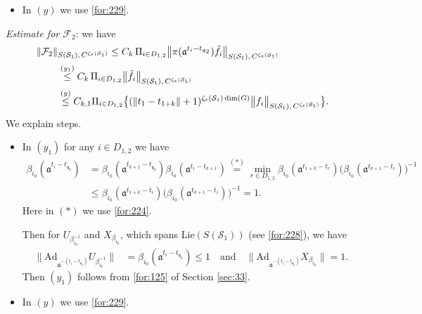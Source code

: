 \documentclass[11 pt]{amsart}
\newcommand{\norm}[1]{\lVert#1\rVert}
\theoremstyle{definition}
\numberwithin{equation}{section}
\begin{document}
\begin{itemize}
  This shows that for any $i\in D_{1,1}\cup D_2\cup \{k+1\}$ we have
 \begin{align*}
  \beta_{i_0}(\mathfrak{a}^{t_{i}-t_{ \mathfrak{q}_1}})\geq 1.
 \end{align*}
  Then for $U_{\beta_{i_0}}$, which spans $\text{Lie}(u(\mathcal{S}_1))$ (see \eqref{for:228}), we have
  \begin{align*}
 \|\text{Ad}_{\mathfrak{a}^{-(t_{i}-t_{ \mathfrak{q}_1})}}U_{\beta_{i_0}}\|=\beta_{i_0}(\mathfrak{a}^{-(t_{i}-t_{ \mathfrak{q}_1})})\leq 1.
\end{align*}
  Then $(x)$ follows from \eqref{for:125} of Section \ref{sec:33}.
  \smallskip
  \item In $(y)$ we use \eqref{for:229}.
\end{itemize}
\emph{Estimate for $\mathcal{F}_2$}: we have
\begin{align}\label{for:234}
 \norm{\mathcal{F}_2}&_{S(\mathcal{S}_1),\,C^{\zeta_\epsilon(\mathcal{S}_1)}}\leq C_k\,\Pi_{i\in D_{1,2}}\big\| \pi(\mathfrak{a}^{t_i-t_{ \mathfrak{q}_2}})\tilde{f}_i\big\|_{S(\mathcal{S}_1),\,C^{\zeta_\epsilon(\mathcal{S}_1)}}\notag\\
 &\overset{(y_1)}{\leq} C_k\,\Pi_{i\in D_{1,2}}\big\| \tilde{f}_i\big\|_{S(\mathcal{S}_1),\,C^{\zeta_\epsilon(\mathcal{S}_1)}}\notag\\
 &\overset{(y)}{\leq} C_{k,1}\Pi_{i\in D_{1,2}}\big\{(\|t_1-t_{1+k}\|+1)^{\zeta_\epsilon(\mathcal{S}_1)\dim (G)}\big\|f_i\big\|_{S(\mathcal{S}_1),\,C^{\zeta_\epsilon(\mathcal{S}_1)}}\big\}.
\end{align}
We explain steps.
\begin{itemize}



  \item In $(y_1)$ for any $i\in D_{1,2}$ we have
 \begin{align*}
   \beta_{i_0}(\mathfrak{a}^{t_{i}-t_{ \mathfrak{q}_2}})&=\beta_{i_0}(\mathfrak{a}^{t_{k+1}-t_{\mathfrak{q}_2}})\beta_{i_0}(\mathfrak{a}^{t_{ i}-t_{k+1}})\overset{(*)}{=}\min_{r\in D_{1,2}} \beta_{i_0}(\mathfrak{a}^{t_{1+k}-t_{r}})\big(\beta_{i_0}(\mathfrak{a}^{t_{k+1}-t_{ i}})\big)^{-1}\\
   &\leq \beta_{i_0}(\mathfrak{a}^{t_{1+k}-t_{i}})\big(\beta_{i_0}(\mathfrak{a}^{t_{k+1}-t_{ i}})\big)^{-1}=1.
 \end{align*}
 Here in $(*)$ we use \eqref{for:224}.

Then for  $U_{\beta_{i_0}^{-1}}$ and $X_{\beta_{i_0}}$, which spans $\text{Lie}(S(\mathcal{S}_1))$ (see \eqref{for:228}), we have
  \begin{align*}
 \|\text{Ad}_{\mathfrak{a}^{-(t_{i}-t_{ \mathfrak{q}_2})}}U_{\beta_{i_0}^{-1}}\|&=\beta_{i_0}(\mathfrak{a}^{t_{i}-t_{ \mathfrak{q}_2}})\leq 1\quad\text{and}\quad
  \|\text{Ad}_{\mathfrak{a}^{-(t_{i}-t_{ \mathfrak{q}_2})}}X_{\beta_{i_0}}\|=1.
\end{align*}
  Then $(y_1)$ follows from \eqref{for:125} of Section \ref{sec:33}.
  \smallskip
\item In $(y)$ we use \eqref{for:229}.
\end{itemize}
\end{document}
